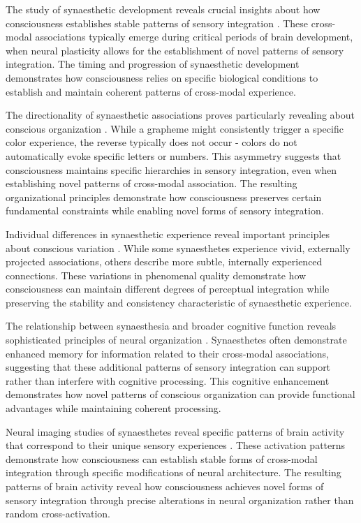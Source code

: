 \begin{refsection}
The study of synaesthetic development reveals crucial insights about how consciousness establishes stable patterns of sensory integration \cite{Barnett2008}. These cross-modal associations typically emerge during critical periods of brain development, when neural plasticity allows for the establishment of novel patterns of sensory integration. The timing and progression of synaesthetic development demonstrates how consciousness relies on specific biological conditions to establish and maintain coherent patterns of cross-modal experience.

The directionality of synaesthetic associations proves particularly revealing about conscious organization \cite{Eagleman2009}. While a grapheme might consistently trigger a specific color experience, the reverse typically does not occur - colors do not automatically evoke specific letters or numbers. This asymmetry suggests that consciousness maintains specific hierarchies in sensory integration, even when establishing novel patterns of cross-modal association. The resulting organizational principles demonstrate how consciousness preserves certain fundamental constraints while enabling novel forms of sensory integration.

Individual differences in synaesthetic experience reveal important principles about conscious variation \cite{Dixon2004}. While some synaesthetes experience vivid, externally projected associations, others describe more subtle, internally experienced connections. These variations in phenomenal quality demonstrate how consciousness can maintain different degrees of perceptual integration while preserving the stability and consistency characteristic of synaesthetic experience.

The relationship between synaesthesia and broader cognitive function reveals sophisticated principles of neural organization \cite{Kadosh2007}. Synaesthetes often demonstrate enhanced memory for information related to their cross-modal associations, suggesting that these additional patterns of sensory integration can support rather than interfere with cognitive processing. This cognitive enhancement demonstrates how novel patterns of conscious organization can provide functional advantages while maintaining coherent processing.

Neural imaging studies of synaesthetes reveal specific patterns of brain activity that correspond to their unique sensory experiences \cite{Nunn2002}. These activation patterns demonstrate how consciousness can establish stable forms of cross-modal integration through specific modifications of neural architecture. The resulting patterns of brain activity reveal how consciousness achieves novel forms of sensory integration through precise alterations in neural organization rather than random cross-activation.


\end{refsection}
